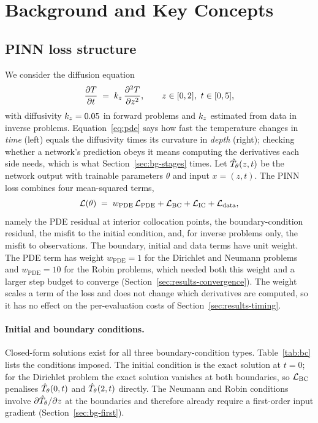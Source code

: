 \section{Background and Key Concepts}
\label{sec:background}

\subsection{PINN loss structure}
\label{sec:bg-loss}
We consider the diffusion equation
\begin{equation}
  \label{eq:pde}
  \frac{\partial T}{\partial t} \;=\; k_z\,\frac{\partial^2 T}{\partial z^2},
  \qquad z\in[0,2],\ t\in[0,5],
\end{equation}
with diffusivity $k_z=0.05$ in forward problems and $k_z$ estimated from data in inverse problems.
Equation~\eqref{eq:pde} says how fast the temperature changes in \emph{time} (left) equals the diffusivity
times its curvature in \emph{depth} (right); checking whether a network's prediction obeys it means computing
the derivatives each side needs, which is what Section~\ref{sec:bg-stages} times.
Let $\hat T_\theta(z,t)$ be the network output with trainable parameters $\theta$ and input $x=(z,t)$.
The PINN loss combines four mean-squared terms,
\begin{equation}
  \label{eq:loss}
  \mathcal{L}(\theta) \;=\; w_{\text{PDE}}\,\mathcal{L}_{\text{PDE}} + \mathcal{L}_{\text{BC}} + \mathcal{L}_{\text{IC}} + \mathcal{L}_{\text{data}},
\end{equation}
namely the PDE residual at interior collocation points, the boundary-condition residual, the misfit to the initial
condition, and, for inverse problems only, the misfit to observations. The boundary, initial and data terms have
unit weight. The PDE term has weight $w_{\text{PDE}}=1$ for the Dirichlet and Neumann problems and
$w_{\text{PDE}}=10$ for the Robin problems, which needed both this weight and a larger step budget to converge
(Section~\ref{sec:results-convergence}). The weight scales a term of the
loss and does not change which derivatives are computed, so it has no effect on the per-evaluation costs of
Section~\ref{sec:results-timing}.

\paragraph{Initial and boundary conditions.}
Closed-form solutions exist for all three boundary-condition types. Table~\ref{tab:bc} lists the conditions
imposed. The initial condition is the exact solution at $t=0$; for the Dirichlet problem the exact solution
vanishes at both boundaries, so $\mathcal{L}_{\text{BC}}$ penalises $\hat T_\theta(0,t)$ and $\hat T_\theta(2,t)$ directly. The Neumann and
Robin conditions involve $\partial\hat T_\theta/\partial z$ at the boundaries and therefore already require a first-order
input gradient (Section~\ref{sec:bg-first}).

